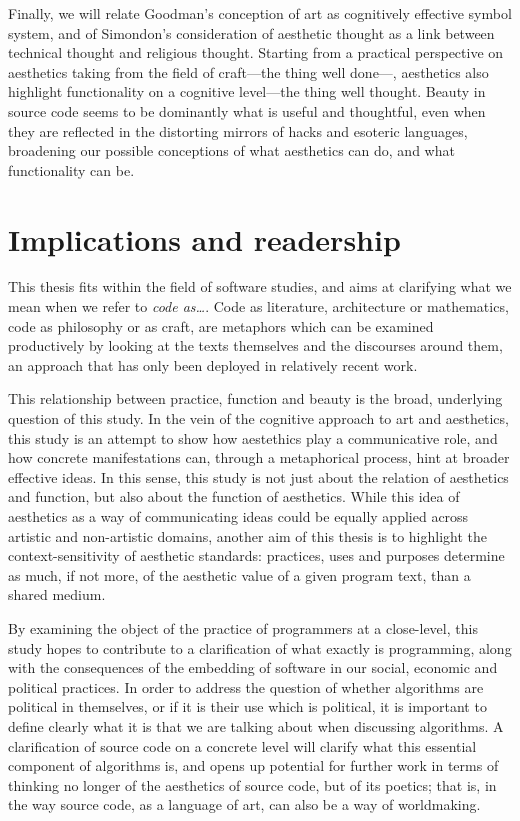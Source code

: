 Finally, we will relate Goodman's conception of art as cognitively effective symbol system, and of Simondon's consideration of aesthetic thought as a link between technical thought and religious thought. Starting from a practical perspective on aesthetics taking from the field of craft—the thing well done—, aesthetics also highlight functionality on a cognitive level—the thing well thought. Beauty in source code seems to be dominantly what is useful and thoughtful, even when they are reflected in the distorting mirrors of hacks and esoteric languages, broadening our possible conceptions of what aesthetics can do, and what functionality can be.

\section{Implications and readership}
\label{sec:implications-readership}

This thesis fits within the field of software studies, and aims at clarifying what we mean when we refer to \emph{code as\dots}. Code as literature, architecture or mathematics, code as philosophy or as craft, are metaphors which can be examined productively by looking at the texts themselves and the discourses around them, an approach that has only been deployed in relatively recent work.

This relationship between practice, function and beauty is the broad, underlying question of this study. In the vein of the cognitive approach to art and aesthetics, this study is an attempt to show how aestethics play a communicative role, and how concrete manifestations can, through a metaphorical process, hint at broader effective ideas. In this sense, this study is not just about the relation of aesthetics and function, but also about the function of aesthetics. While this idea of aesthetics as a way of communicating ideas could be equally applied across artistic and non-artistic domains, another aim of this thesis is to highlight the context-sensitivity of aesthetic standards: practices, uses and purposes determine as much, if not more, of the aesthetic value of a given program text, than a shared medium.

By examining the object of the practice of programmers at a close-level, this study hopes to contribute to a clarification of what exactly is programming, along with the consequences of the embedding of software in our social, economic and political practices. In order to address the question of whether algorithms are political in themselves, or if it is their use which is political, it is important to define clearly what it is that we are talking about when discussing algorithms. A clarification of source code on a concrete level will clarify what this essential component of algorithms is, and opens up potential for further work in terms of thinking no longer of the aesthetics of source code, but of its poetics; that is, in the way source code, as a language of art, can also be a way of worldmaking.

